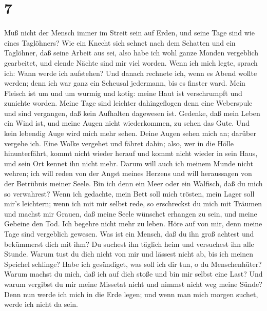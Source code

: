 \hypertarget{section-6}{%
\section{7}\label{section-6}}

 Muß nicht der Mensch immer im Streit sein auf Erden, und
seine Tage sind wie eines Taglöhners?  Wie ein Knecht sich
sehnet nach dem Schatten und ein Taglöhner, daß seine Arbeit aus sei,
 also habe ich wohl ganze Monden vergeblich gearbeitet, und
elende Nächte sind mir viel worden.  Wenn ich mich legte,
sprach ich: Wann werde ich aufstehen? Und danach rechnete ich, wenn es
Abend wollte werden; denn ich war ganz ein Scheusal jedermann, bis es
finster ward.  Mein Fleisch ist um und um wurmig und kotig:
meine Haut ist verschrumpft und zunichte worden.  Meine Tage
sind leichter dahingeflogen denn eine Weberspule und sind vergangen, daß
kein Aufhalten dagewesen ist.  Gedenke, daß mein Leben ein
Wind ist, und meine Augen nicht wiederkommen, zu sehen das Gute.
 Und kein lebendig Auge wird mich mehr sehen. Deine Augen
sehen mich an; darüber vergehe ich.  Eine Wolke vergehet und
fähret dahin; also, wer in die Hölle hinunterfährt, kommt nicht wieder
herauf  und kommt nicht wieder in sein Haus, und sein Ort
kennet ihn nicht mehr.  Darum will auch ich meinem Munde
nicht wehren; ich will reden von der Angst meines Herzens und will
heraussagen von der Betrübnis meiner Seele.  Bin ich denn
ein Meer oder ein Walfisch, daß du mich so verwahrest? 
Wenn ich gedachte, mein Bett soll mich trösten, mein Lager soll mir's
leichtern;  wenn ich mit mir selbst rede, so erschreckst du
mich mit Träumen und machst mir Grauen,  daß meine Seele
wünschet erhangen zu sein, und meine Gebeine den Tod.  Ich
begehre nicht mehr zu leben. Höre auf von mir, denn meine Tage sind
vergeblich gewesen.  Was ist ein Mensch, daß du ihn groß
achtest und bekümmerst dich mit ihm?  Du suchest ihn
täglich heim und versuchest ihn alle Stunde.  Warum tust du
dich nicht von mir und lässest nicht ab, bis ich meinen Speichel
schlinge?  Habe ich gesündiget, was soll ich dir tun, o du
Menschenhüter? Warum machst du mich, daß ich auf dich stoße und bin mir
selbst eine Last?  Und warum vergibst du mir meine Missetat
nicht und nimmst nicht weg meine Sünde? Denn nun werde ich mich in die
Erde legen; und wenn man mich morgen suchet, werde ich nicht da sein.


